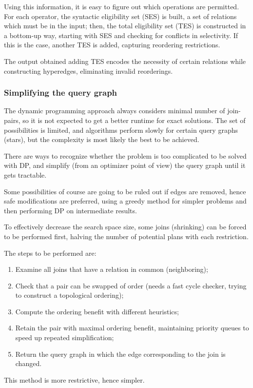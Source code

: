 Using this information, it is easy to figure out which operations are permitted. For each operator, the syntactic eligibility set (SES) is built, a set of relations which must be in the input; then, the total eligibility set (TES) is constructed in a bottom-up way, starting with SES and checking for conflicts in selectivity. If this is the case, another TES is added, capturing reordering restrictions. 

The output obtained adding TES encodes the necessity of certain relations while constructing hyperedges, eliminating invalid reorderings.

\subsubsection{Simplifying the query graph}
The dynamic programming approach always considers minimal number of join-pairs, so it is not expected to get a better runtime for exact solutions. The set of possibilities is limited, and algorithms perform slowly for certain query graphs (stars), but the complexity is most likely the best to be achieved.

There are ways to recognize whether the problem is too complicated to be solved with DP, and simplify (from an optimizer point of view) the query graph until it gets tractable. 

Some possibilities of course are going to be ruled out if edges are removed, hence safe modifications are preferred, using a greedy method for simpler problems and then performing DP on intermediate results. 

To effectively decrease the search space size, some joins (shrinking) can be forced to be performed first, halving the number of potential plans with each restriction. 

The steps to be performed are:
\begin{enumerate}
	\item Examine all joins that have a relation in common (neighboring);
	\item Check that a pair can be swapped of order (needs a fast cycle checker, trying to construct a topological ordering);
	\item Compute the ordering benefit with different heuristics;
	\item Retain the pair with maximal ordering benefit, maintaining priority queues to speed up repeated simplification;
	\item Return the query graph in which the edge corresponding to the join is changed.
\end{enumerate}
This method is more restrictive, hence simpler. 

